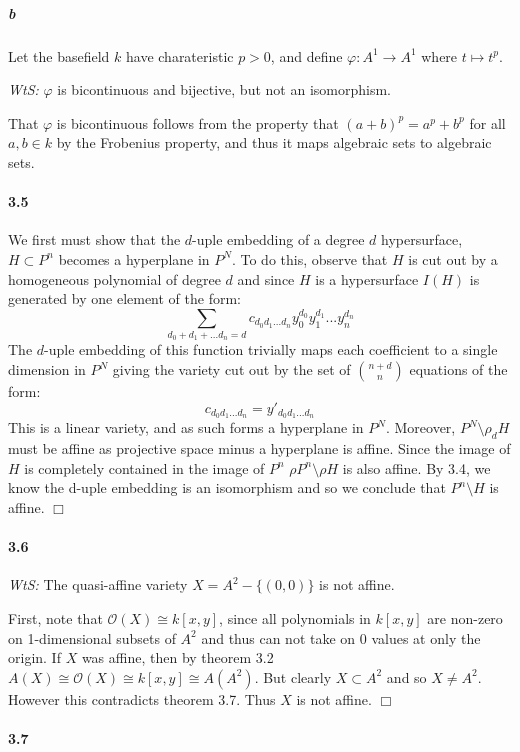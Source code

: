 \documentclass{article}
\begin{document}
\subparagraph{b} Let the basefield $k$ have charateristic $p > 0$, and define $\varphi : A^1 \to A^1$ where $t \mapsto t^p$.

\emph{WtS:} $\varphi$ is bicontinuous and bijective, but not an isomorphism.

That $\varphi$ is bicontinuous follows from the property that $(a + b)^p = a^p + b^p$ for all $a,b \in k$ by the Frobenius property, and thus it maps algebraic sets to algebraic sets.


\paragraph{3.5}

We first must show that the $d$-uple embedding of a degree $d$ hypersurface, $H \subset P^n$ becomes a hyperplane in $P^N$.  To do this, observe that $H$ is cut out by a homogeneous polynomial of degree $d$ and since $H$ is a hypersurface $I(H)$ is generated by one element of the form:
\[ \sum \limits_{d_0 + d_1 + ... d_n = d} c_{d_0 d_1 ... d_n} y_0^{d_0} y_1^{d_1} ... y_n^{d_n} \]
The $d$-uple embedding of this function trivially maps each coefficient to a single dimension in $P^N$ giving the variety cut out by the set of ${ n + d \choose n }$ equations of the form:
\[ c_{d_0 d_1... d_n } = y'_{d_0 d_1 ... d_n} \]
This is a linear variety, and as such forms a hyperplane in $P^N$.  Moreover, $P^N \setminus \rho_d H$ must be affine as projective space minus a hyperplane is affine. Since the image of $H$ is completely contained in the image of $P^n$ $\rho P^n \setminus \rho H$ is also affine.  By 3.4, we know the d-uple embedding is an isomorphism and so we conclude that $P^n \setminus H$ is affine. $\Box$

\paragraph{3.6}

\emph{WtS:} The quasi-affine variety $X = A^2 - \{(0,0)\}$ is not affine.

First, note that $\mathcal{O}(X) \cong k[x,y]$, since all polynomials in $k[x,y]$ are non-zero on 1-dimensional subsets of $A^2$ and thus can not take on 0 values at only the origin.  If $X$ was affine, then by theorem 3.2 $A(X) \cong \mathcal{O}(X) \cong k[x,y] \cong A(A^2)$.  But clearly $X \subset A^2$ and so $X \neq A^2$.  However this contradicts theorem 3.7.  Thus $X$ is not affine. $\Box$


\paragraph{3.7}
\end{document}
